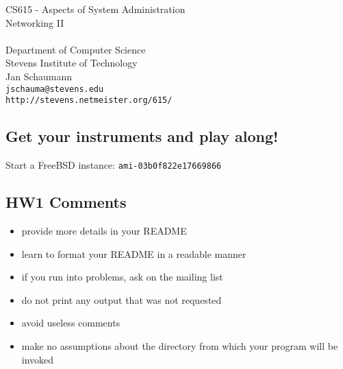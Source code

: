 \documentclass[xga]{xdvislides}
\begin{document}
\setfontphv

\lhead{\slidetitle}                               %
\cfoot{\relax}                               %
\rfoot{\Gray{\today}}

\vspace*{\fill}
\begin{center}
	\Hugesize
		CS615 - Aspects of System Administration\\ [1em]
		Networking II\\ [1em]
	\hspace*{5mm}\blueline\\ [1em]
	\Normalsize
		Department of Computer Science\\
		Stevens Institute of Technology\\
		Jan Schaumann\\
		\verb+jschauma@stevens.edu+\\
		\verb+http://stevens.netmeister.org/615/+
\end{center}
\vspace*{\fill}

\subsection{Get your instruments and play along!}

\Hugesize
\vspace*{\fill}
Start a FreeBSD instance: {\tt ami-03b0f822e17669866}
\vspace*{\fill}
\Normalsize

\subsection{HW1 Comments}

\begin{itemize}
	\item provide more details in your README
	\item learn to format your README in a
		readable manner
	\item if you run into problems, ask on the mailing list
	\item do not print any output that was not requested
	\item avoid useless comments
	\item make no assumptions about the directory
		from which your program will be invoked
\end{itemize}
\end{document}
